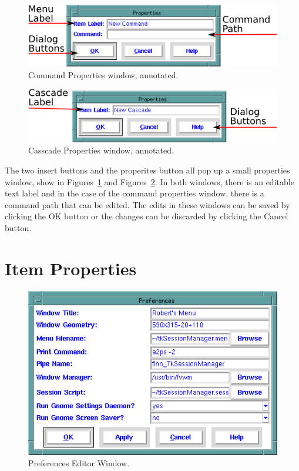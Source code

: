 \begin{figure}[hbpt] 
\begin{centering}
\includegraphics{CommandPropertiesAnnotated.png} 
\caption{Command Properties window, annotated.} 
\label{ref:fig:commandprop} 
\end{centering}
\end{figure}
\begin{figure}[hbpt] 
\begin{centering}
\includegraphics{CasscadePropertiesAnnotated.png} 
\caption{Casscade Properties window, annotated.} 
\label{ref:fig:cascadeprop} 
\end{centering}
\end{figure}
The two insert buttons and the properites button
all pop up a small properties window, show in
Figures~\ref{ref:fig:commandprop} and Figures~\ref{ref:fig:cascadeprop}.
In both windows, there is an editable text label and in the case of the
command properties window, there is a command path that can be edited.
The edits in these windows can be saved by clicking the OK button or the
changes can be discarded by clicking the Cancel button.



\section{Item Properties}
\label{sect:ItemProperties}

\begin{figure}[hbpt]
\begin{centering}
\includegraphics[width=5in]{PreferencesEditor.png}
\caption{Preferences Editor Window.}
\label{ref:fig:preferenceseditor}
\end{centering}
\end{figure}



